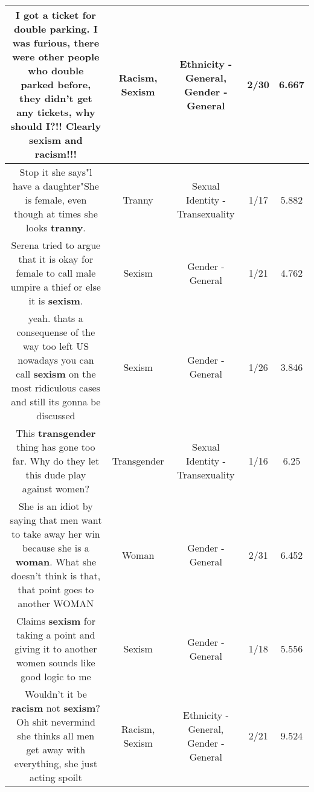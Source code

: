 \documentclass[11pt]{article}
\newlength\mylength
\begin{document}
\begin{center}
\begin{longtable}{|C{.65\mylength}|C{.30\mylength}|C{.12\mylength}|C{.12\mylength}|C{.12\mylength}|}
  \small I got a ticket for double parking. I was furious, there were other people who double parked before, they didn't get any tickets, why should I?!! Clearly \textbf{sexism} and \textbf{racism}!!!\normalsize   & Racism, Sexism & Ethnicity - General, Gender - General & 2/30 & 6.667 \\  \hline
  \small Stop it she says"l have a daughter"She is female, even though at times she looks \textbf{tranny}.\normalsize   & Tranny & Sexual Identity - Transexuality & 1/17 & 5.882 \\  \hline
  \small Serena tried to argue that it is okay for female to call male umpire a thief or else it is \textbf{sexism}.\normalsize   & Sexism & Gender - General & 1/21 & 4.762 \\  \hline
  \small yeah. thats a consequense of the way too left US   nowadays you can call \textbf{sexism} on the most ridiculous cases and still its gonna be discussed  \normalsize   & Sexism & Gender - General & 1/26 & 3.846 \\  \hline
  \small This \textbf{transgender} thing has gone too far. Why do they let this dude play against women?\normalsize   & Transgender & Sexual Identity - Transexuality & 1/16 & 6.25 \\  \hline
  \small She is an idiot by saying that men want to take away her win because she is a \textbf{woman}. What she doesn't think is that, that point goes to another WOMAN\normalsize   & Woman & Gender - General & 2/31 & 6.452 \\  \hline
  \small Claims \textbf{sexism} for taking a point and giving it to another women sounds like good logic to me\normalsize   & Sexism & Gender - General & 1/18 & 5.556 \\  \hline
  \small Wouldn't it be \textbf{racism} not \textbf{sexism}? Oh shit nevermind she thinks all men get away with everything, she just acting spoilt\normalsize   & Racism, Sexism & Ethnicity - General, Gender - General & 2/21 & 9.524 \\  \hline

\end{longtable}
\end{center}
\end{document}
